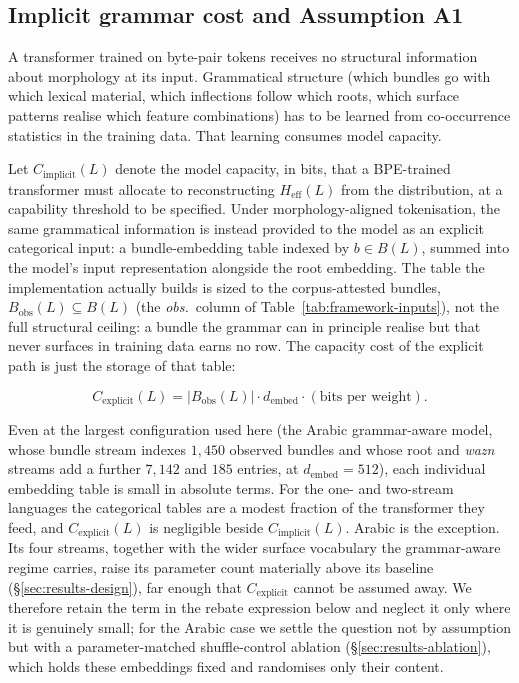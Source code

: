 \subsection{Implicit grammar cost and Assumption A1}
\label{sec:framework-A1}

A transformer trained on byte-pair tokens receives no structural information about morphology at its input. Grammatical structure (which bundles go with which lexical material, which inflections follow which roots, which surface patterns realise which feature combinations) has to be learned from co-occurrence statistics in the training data. That learning consumes model capacity.

Let $C_{\mathrm{implicit}}(L)$ denote the model capacity, in bits, that a BPE-trained transformer must allocate to reconstructing $H_{\mathrm{eff}}(L)$ from the distribution, at a capability threshold to be specified. Under morphology-aligned tokenisation, the same grammatical information is instead provided to the model as an explicit categorical input: a bundle-embedding table indexed by $b \in B(L)$, summed into the model's input representation alongside the root embedding. The table the implementation actually builds is sized to the corpus-attested bundles, $B_{\mathrm{obs}}(L) \subseteq B(L)$ (the \emph{obs.}\ column of Table~\ref{tab:framework-inputs}), not the full structural ceiling: a bundle the grammar can in principle realise but that never surfaces in training data earns no row. The capacity cost of the explicit path is just the storage of that table:

\begin{equation}
C_{\mathrm{explicit}}(L) = |B_{\mathrm{obs}}(L)| \cdot d_{\mathrm{embed}} \cdot (\text{bits per weight}).
\label{eq:Cexplicit}
\end{equation}

Even at the largest configuration used here (the Arabic grammar-aware model, whose bundle stream indexes $1{,}450$ observed bundles and whose root and \emph{wazn} streams add a further $7{,}142$ and $185$ entries, at $d_{\mathrm{embed}} = 512$), each individual embedding table is small in absolute terms. For the one- and two-stream languages the categorical tables are a modest fraction of the transformer they feed, and $C_{\mathrm{explicit}}(L)$ is negligible beside $C_{\mathrm{implicit}}(L)$. Arabic is the exception. Its four streams, together with the wider surface vocabulary the grammar-aware regime carries, raise its parameter count materially above its baseline (\S\ref{sec:results-design}), far enough that $C_{\mathrm{explicit}}$ cannot be assumed away. We therefore retain the term in the rebate expression below and neglect it only where it is genuinely small; for the Arabic case we settle the question not by assumption but with a parameter-matched shuffle-control ablation (\S\ref{sec:results-ablation}), which holds these embeddings fixed and randomises only their content.

